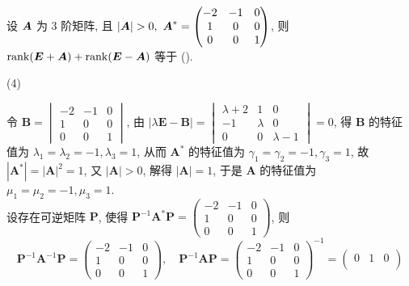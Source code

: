 \begin{example}
    设 $\vb*{A}$ 为 $3$ 阶矩阵, 且 $|\vb*{A}|>0,~\vb*{A}^*=\begin{pmatrix} -2 & -1 & 0 \\ 1 & 0 & 0 \\ 0 & 0 & 1 \\\end{pmatrix}$, 则 $\rank(\vb*{E}+\vb*{A})+\rank(\vb*{E}-\vb*{A})$ 等于 (\quad).
    \begin{tasks}(4)
    \end{tasks}
\end{example}
\begin{solution}
    令 $ \boldsymbol{B}=\begin{vmatrix}-2 & -1 & 0 \\ 1 & 0 & 0 \\ 0 & 0 & 1\end{vmatrix}$, 由 $ |\lambda \boldsymbol{E}-\boldsymbol{B}|=\begin{vmatrix}\lambda+2 & 1 & 0 \\ -1 & \lambda & 0 \\ 0 & 0 & \lambda-1\end{vmatrix}=0 $, 得 $ \boldsymbol{B} $ 的特征值为 $ \lambda_{1}=\lambda_{2}=-1, \lambda_{3}=1 $, 从而 $ \boldsymbol{A}^{*} $ 的特征值为 $ \gamma_{1}=\gamma_{2}=-1, \gamma_{3}=1 $, 故 $ \left|\boldsymbol{A}^{*}\right|=|\boldsymbol{A}|^{2}=1 $, 又 $ |\boldsymbol{A}|>0 $, 解得 $ |\boldsymbol{A}|=1 $, 于是 $ \boldsymbol{A} $ 的特征值为 $ \mu_{1}=\mu_{2}=-1, \mu_{3}=1 .$\\
    设存在可逆矩阵 $ \boldsymbol{P} $, 使得 $ \boldsymbol{P}^{-1} \boldsymbol{A}^{*} \boldsymbol{P}=\begin{pmatrix}-2 & -1 & 0 \\ 1 & 0 & 0 \\ 0 & 0 & 1\end{pmatrix}$, 则
$$
\boldsymbol{P}^{-1} \boldsymbol{A}^{-1} \boldsymbol{P}=\begin{pmatrix}-2 & -1 & 0 \\
    1 & 0 & 0 \\
    0 & 0 & 1\end{pmatrix}
,\quad \boldsymbol{P}^{-1} \boldsymbol{A} \boldsymbol{P}=\begin{pmatrix}-2 & -1 & 0 \\
    1 & 0 & 0 \\
    0 & 0 & 1\end{pmatrix}^{-1}=\begin{pmatrix}0 & 1 & 0 \\

\end{pmatrix}$$
\end{solution}
